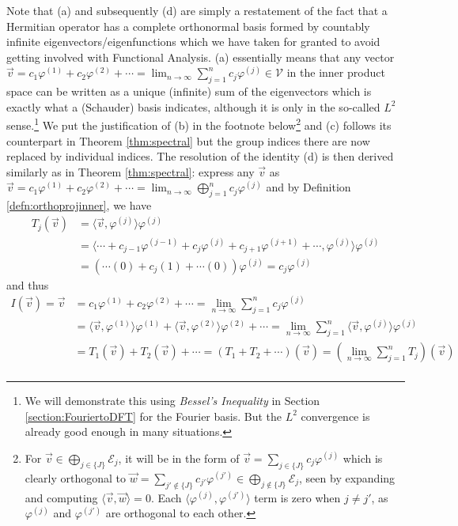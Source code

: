Note that (a) and subsequently (d) are simply a restatement of the fact that a Hermitian operator has a complete orthonormal basis formed by countably infinite eigenvectors/eigenfunctions which we have taken for granted to avoid getting involved with Functional Analysis. (a) essentially means that any vector $\vec{v} = c_1\varphi^{(1)} + c_2\varphi^{(2)} + \cdots = \lim_{n \to \infty}\sum_{j=1}^{n}c_j\varphi^{(j)} \in \mathcal{V}$ in the inner product space can be written as a unique (infinite) sum of the eigenvectors which is exactly what a (Schauder) basis indicates, although it is only in the so-called $L^2$ sense.\footnote{We will demonstrate this using \textit{Bessel's Inequality} in Section \ref{section:FouriertoDFT} for the Fourier basis. But the $L^2$ convergence is already good enough in many situations.} We put the justification of (b) in the footnote below\footnote{For $\vec{v} \in \bigoplus_{j \in \{J\}} \mathcal{E}_{j}$, it will be in the form of $\vec{v} = \sum_{j \in \{J\}} c_j\varphi^{(j)}$ which is clearly orthogonal to $\vec{w} = \sum_{j' \notin \{J\}} c_{j'}\varphi^{(j')} \in \bigoplus_{j \notin \{J\}} \mathcal{E}_{j}$, seen by expanding and computing $\langle \vec{v}, \vec{w} \rangle = 0$. Each $\langle \varphi^{(j)}, \varphi^{(j')} \rangle$ term is zero when $j \neq j'$, as $\varphi^{(j)}$ and $\varphi^{(j')}$ are orthogonal to each other.} and (c) follows its counterpart in Theorem \ref{thm:spectral} but the group indices there are now replaced by individual indices. The resolution of the identity (d) is then derived similarly as in Theorem \ref{thm:spectral}: express any $\vec{v}$ as $\vec{v} = c_1\varphi^{(1)} + c_2\varphi^{(2)} + \cdots = \lim_{n \to \infty} \bigoplus_{j=1}^{n} c_j\varphi^{(j)}$ and by Definition \ref{defn:orthoprojinner}, we have
\begin{align*}
T_j(\vec{v}) &= \langle \vec{v}, \varphi^{(j)} \rangle \varphi^{(j)} \\
&= \langle \cdots + c_{j-1}\varphi^{(j-1)} + c_j\varphi^{(j)} + c_{j+1}\varphi^{(j+1)} + \cdots, \varphi^{(j)} \rangle \varphi^{(j)} \\
&= (\cdots(0) + c_{j}(1) + \cdots(0))\varphi^{(j)} = c_j\varphi^{(j)}
\end{align*}
and thus
\begin{align*}
I(\vec{v}) = \vec{v} &= c_1\varphi^{(1)} + c_2\varphi^{(2)} + \cdots = \lim_{n \to \infty} \sum_{j=1}^{n} c_j\varphi^{(j)} \\
&= \langle \vec{v}, \varphi^{(1)} \rangle \varphi^{(1)} + \langle \vec{v}, \varphi^{(2)} \rangle \varphi^{(2)} + \cdots = \lim_{n \to \infty} \sum_{j=1}^{n} \langle \vec{v}, \varphi^{(j)} \rangle \varphi^{(j)} \\ 
&= T_1(\vec{v}) + T_2(\vec{v}) + \cdots = (T_1 + T_2 + \cdots)(\vec{v}) =  (\lim_{n \to \infty} \sum_{j=1}^{n} T_j)(\vec{v}) \\
\end{align*}
